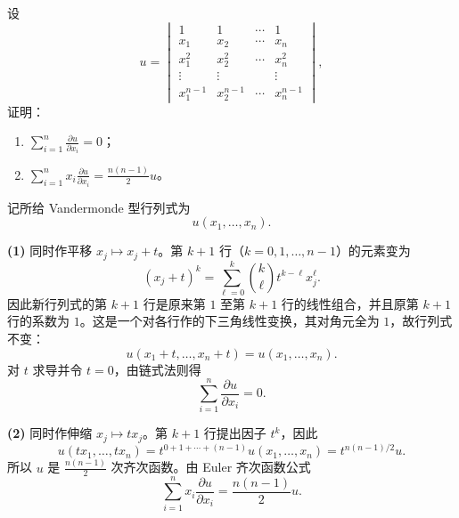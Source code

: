 \begin{xreferenceproblem}[5]
设
  \[
    u=
    \begin{vmatrix}
      1&1&\cdots&1\\
      x_1&x_2&\cdots&x_n\\
      x_1^2&x_2^2&\cdots&x_n^2\\
      \vdots&\vdots&&\vdots\\
      x_1^{n-1}&x_2^{n-1}&\cdots&x_n^{n-1}
    \end{vmatrix},
  \]
  证明：
  \begin{enumerate}[label=(\arabic*)]
    \item $\sum_{i=1}^n\frac{\partial u}{\partial x_i}=0$；
    \item $\sum_{i=1}^n x_i\frac{\partial u}{\partial x_i}=\frac{n(n-1)}2u$。
  \end{enumerate}
\end{xreferenceproblem}
\begin{xsolution}
记所给 Vandermonde 型行列式为
\[
  u(x_1,\ldots,x_n).
\]

\textbf{(1)} 同时作平移 $x_j\mapsto x_j+t$。第 $k+1$ 行（$k=0,1,\ldots,n-1$）的元素变为
\[
  (x_j+t)^k
  =\sum_{\ell=0}^k\binom{k}{\ell}t^{k-\ell}x_j^\ell.
\]
因此新行列式的第 $k+1$ 行是原来第 $1$ 至第 $k+1$ 行的线性组合，并且原第 $k+1$ 行的系数为 $1$。这是一个对各行作的下三角线性变换，其对角元全为 $1$，故行列式不变：
\[
  u(x_1+t,\ldots,x_n+t)=u(x_1,\ldots,x_n).
\]
对 $t$ 求导并令 $t=0$，由链式法则得
\[
  \boxed{\sum_{i=1}^n\frac{\partial u}{\partial x_i}=0}.
\]

\textbf{(2)} 同时作伸缩 $x_j\mapsto t x_j$。第 $k+1$ 行提出因子 $t^k$，因此
\[
  u(tx_1,\ldots,tx_n)
  =t^{0+1+\cdots+(n-1)}u(x_1,\ldots,x_n)
  =t^{n(n-1)/2}u.
\]
所以 $u$ 是 $\frac{n(n-1)}2$ 次齐次函数。由 Euler 齐次函数公式
\[
  \boxed{
  \sum_{i=1}^n x_i\frac{\partial u}{\partial x_i}
  =\frac{n(n-1)}2u}.
\]
\end{xsolution}


